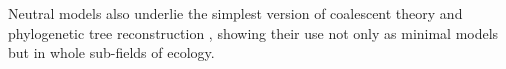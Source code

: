 Neutral models also underlie the simplest version of coalescent theory and phylogenetic tree reconstruction \cite{Kingman1982,Rice2004}, showing their use not only as minimal models but in whole sub-fields of ecology. 

